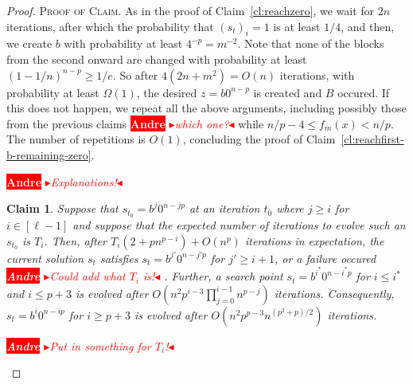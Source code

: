 \documentclass[
sigconf = false, %
review = false, %
screen = true, %
anonymous = true, %
format=acmsmall
]{acmart}
\newtheorem{claim}{Claim}
\newenvironment{proofofclaim}{\textsc{Proof of Claim.}}{\hfill\scriptsize\scalebox{1}{$\blacksquare$}}
\newcommand{\nbc}[3]{
		{\colorbox{#3}{\bfseries\sffamily\scriptsize\textcolor{white}{#1}}}
		{\textcolor{#3}{\sf\small$\blacktriangleright$\textit{#2}$\blacktriangleleft$}}
}
\newcommand{\andre}[1]{\nbc{Andre}{#1}{red}}
\begin{document}
\begin{proof}
\begin{proofofclaim}
	As in the proof of Claim~\ref{cl:reachzero}, we wait for $2n$ iterations, after which the probability that $(s_t)_i=1$ is at least $1/4$, and then, we create $b$ with probability at least $4^{-p} = m^{-2}$. Note that none of the blocks from the second onward are changed with probability at least $(1-1/n)^{n-p} \geq 1/e$. So after  $4(2n + m^2) = O(n)$ iterations, with probability at least $\Omega(1)$, the desired $z=b0^{n-p}$ is created and $B$ occured. If this does not happen, we repeat all the above arguments, including possibly those from the previous claims \andre{which one?} while $n/p-4 \leq f_m(x) < n/p$. The number of repetitions is $O(1)$, concluding the proof of Claim~\ref{cl:reachfirst-b-remaining-zero}. 
\end{proofofclaim}

\andre{Explanations!}

\begin{claim}
	\label{cl:reachfirstnumber-b-remaining-zero}
	Suppose that $s_{t_0} =b^j0^{n-jp}$ at an iteration $t_0$ where $j \geq i$ for $i \in [\ell-1]$ and suppose that the expected number of iterations to evolve such an $s_{t_0}$ is $T_i$. Then, after $T_i(2+pn^{p-i}) + O(n^p)$ iterations in expectation, the current solution $s_t$ satisfies  $s_t =b^{j'}0^{n-j'p}$ for $j' \geq i+1$, or a failure occured \andre{Could add what $T_i$ is!}. Further, a search point $s_t =b^{i^*}0^{n-i^*p}$ for $i \leq i^*$ and $i \leq p+3$ is evolved after $O(n^2p^{i-3}\prod_{j=0}^{i-1}n^{p-j})$ iterations. Consequently, 
	$s_t =b^{i}0^{n-ip}$ for $i \geq p+3$ is evolved after $O(n^2p^{p-3} n^{(p^2+p)/2})$ iterations.
	
	\andre{Put in something for $T_i$!}
\end{claim}


\end{proof}
\end{document}
